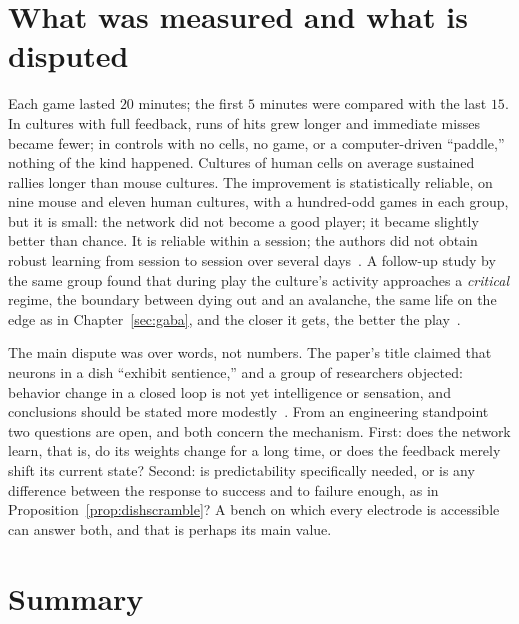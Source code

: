 \section{What was measured and what is disputed}

Each game lasted $20$ minutes; the first $5$ minutes were compared with the last $15$. In cultures with full feedback, runs of hits grew longer and immediate misses became fewer; in controls with no cells, no game, or a computer-driven ``paddle,'' nothing of the kind happened. Cultures of human cells on average sustained rallies longer than mouse cultures. The improvement is statistically reliable, on nine mouse and eleven human cultures, with a hundred-odd games in each group, but it is small: the network did not become a good player; it became slightly better than chance. It is reliable within a session; the authors did not obtain robust learning from session to session over several days~\cite{Kagan2022}. A follow-up study by the same group found that during play the culture's activity approaches a \emph{critical} regime, the boundary between dying out and an avalanche, the same life on the edge as in Chapter~\ref{sec:gaba}, and the closer it gets, the better the play~\cite{Habibollahi2023}.

The main dispute was over words, not numbers. The paper's title claimed that neurons in a dish ``exhibit sentience,'' and a group of researchers objected: behavior change in a closed loop is not yet intelligence or sensation, and conclusions should be stated more modestly~\cite{Balci2023}. From an engineering standpoint two questions are open, and both concern the mechanism. First: does the network learn, that is, do its weights change for a long time, or does the feedback merely shift its current state? Second: is predictability specifically needed, or is any difference between the response to success and to failure enough, as in Proposition~\ref{prop:dishscramble}? A bench on which every electrode is accessible can answer both, and that is perhaps its main value.



\section{Summary}

